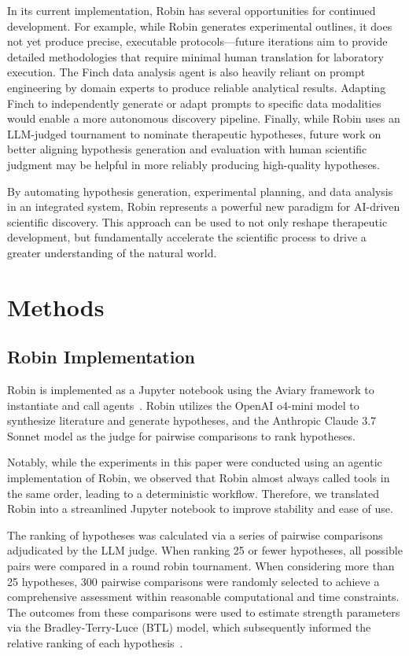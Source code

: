 \documentclass{article}
\begin{document}
In its current implementation, Robin has several opportunities for continued development. For example, while Robin generates experimental outlines, it does not yet produce precise, executable protocols—future iterations aim to provide detailed methodologies that require minimal human translation for laboratory execution. The Finch data analysis agent is also heavily reliant on prompt engineering by domain experts to produce reliable analytical results. Adapting Finch to independently generate or adapt prompts to specific data modalities would enable a more autonomous discovery pipeline. Finally, while Robin uses an LLM-judged tournament to nominate therapeutic hypotheses, future work on better aligning hypothesis generation and evaluation with human scientific judgment may be helpful in more reliably producing high-quality hypotheses. 

By automating hypothesis generation, experimental planning, and data analysis in an integrated system, Robin represents a powerful new paradigm for AI-driven scientific discovery. This approach can be used to not only reshape therapeutic development, but fundamentally accelerate the scientific process to drive a greater understanding of the natural world.

\section{Methods}

\subsection{Robin Implementation}
Robin is implemented as a Jupyter notebook using the Aviary framework to instantiate and call agents~\cite{Narayanan_Braza_Griffiths_Ponnapati_Bou_Laurent_Kabeli_Wellawatte_Cox_Rodriques_et}. Robin utilizes the OpenAI o4-mini model to synthesize literature and generate hypotheses, and the Anthropic Claude 3.7 Sonnet model as the judge for pairwise comparisons to rank hypotheses.

Notably, while the experiments in this paper were conducted using an agentic implementation of Robin, we observed that Robin almost always called tools in the same order, leading to a deterministic workflow. Therefore, we translated Robin into a streamlined Jupyter notebook to improve stability and ease of use.

The ranking of hypotheses was calculated via a series of pairwise comparisons adjudicated by the LLM judge. When ranking 25 or fewer hypotheses, all possible pairs were compared in a round robin tournament. When considering more than 25 hypotheses, 300 pairwise comparisons were randomly selected to achieve a comprehensive assessment within reasonable computational and time constraints. The outcomes from these comparisons were used to estimate strength parameters via the Bradley-Terry-Luce (BTL) model, which subsequently informed the relative ranking of each hypothesis~\cite{bradley_rank_1952}.
\end{document}
